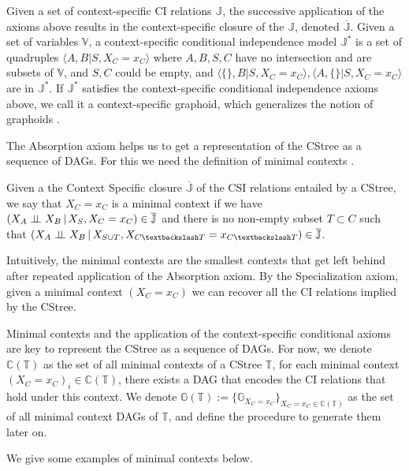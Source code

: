\documentclass{tufte-book}
\begin{document}
Given a set of context-specific CI relations \(\mathbb{J}\), the successive application of the axioms above results in the context-specific closure  of the \(\mathbb{J}\), denoted \(\mathbb{\overline{J}}\). Given a set of variables \(\mathbb{V}\), a context-specific conditional independence model \(\mathbb{J}^*\) is a set of quadruples \(\langle A, B|S, X_C=x_C\rangle\) where \(A,B,S,C\) have no intersection and are subsets of \(\mathbb{V}\), and \(S,C\) could be empty, and \(\langle \{\},B|S,X_C=x_C\rangle, \langle A,\{\}|S,X_C=x_C\rangle\) are in \(\mathbb{J}^*\). If \(\mathbb{J}^*\) satisfies the context-specific conditional independence axioms above, we call it a context-specific graphoid, which generalizes the notion of graphoids \cite{pearl-1986-graph}.


The Absorption axiom helps us to get a representation of the CStree as a sequence of DAGs. For this we need the definition of minimal contexts \cite{duarte-2021-repres-contex}.
\begin{definition}\label{def:mcs}
Given a the Context Specific closure $\mathbb{\overline{J}}$ of the CSI relations entailed by a CStree, we say that ${X_C=x_C}$ is a minimal context if we have $(X_A  \perp \!\!\! \perp X_B \,|\, X_S, X_C=x_C) \in \mathbb{\overline{J}}$ and there is no non-empty subset $T \subset C$ such that $(X_A \indep X_B \,|\, X_{S \cup T}, X_{C \textbackslash T}=x_{C\textbackslash T}) \in \mathbb{\overline{J}}$.
\end{definition}

Intuitively, the minimal contexts are the smallest contexts that get left behind after repeated application of the Absorption axiom. By the Specialization axiom, given a minimal context \((X_C=x_C)\) we can recover all the CI relations implied by the CStree.

Minimal contexts and the application of the context-specific conditional axioms are key to represent the CStree as a sequence of DAGs. For now, we denote \(\mathbb{C}(\mathbb{T})\) as the set of all minimal contexts of a CStree \(\mathbb{T}\), for each minimal context \((X_C=x_C)_i \in \mathbb{C}(\mathbb{T})\), there exists a DAG that encodes the CI relations that hold under this context.  We denote \(\mathbb{G}(\mathbb{T}) := \{ \mathbb{G}_{X_C=x_C} \}_{X_C=x_C \in \mathbb{C}(\mathbb{T})}\) as the set of all minimal context DAGs of \(\mathbb{T}\), and define the procedure to generate them later on.


We give some examples of minimal contexts below.
\end{document}
